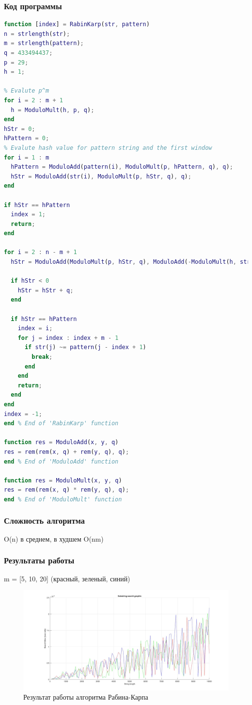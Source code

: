 \documentclass[12pt]{article}
\begin{document}
\subsubsection{Код программы}
\begin{lstlisting}[language={Matlab}, caption={Алгоритм Рабина-Карпа}, label={Script}]
function [index] = RabinKarp(str, pattern)
n = strlength(str);
m = strlength(pattern);
q = 433494437;
p = 29;
h = 1;

% Evalute p^m
for i = 2 : m + 1
  h = ModuloMult(h, p, q);
end
hStr = 0;
hPattern = 0;
% Evalute hash value for pattern string and the first window
for i = 1 : m
  hPattern = ModuloAdd(pattern(i), ModuloMult(p, hPattern, q), q);
  hStr = ModuloAdd(str(i), ModuloMult(p, hStr, q), q);
end

if hStr == hPattern
  index = 1;
  return;
end

for i = 2 : n - m + 1   
  hStr = ModuloAdd(ModuloMult(p, hStr, q), ModuloAdd(-ModuloMult(h, str(i - 1), q), str(i + m - 1), q), q);

  if hStr < 0
    hStr = hStr + q;
  end

  if hStr == hPattern
    index = i;
    for j = index : index + m - 1
      if str(j) ~= pattern(j - index + 1)
        break;
      end
    end
    return;
  end
end
index = -1;
end % End of 'RabinKarp' function

function res = ModuloAdd(x, y, q)
res = rem(rem(x, q) + rem(y, q), q);
end % End of 'ModuloAdd' function

function res = ModuloMult(x, y, q)
res = rem(rem(x, q) * rem(y, q), q);
end % End of 'ModuloMult' function
\end{lstlisting}
\subsubsection{Сложность алгоритма}
O(n) в среднем, в худшем O(nm)
\subsubsection{Результаты работы}
m = [5, 10, 20] (красный, зеленый, синий)
\begin{figure}[h]
	\centering
	\includegraphics[width=0.8\linewidth]{RK.jpg}
	\caption{Результат работы алгоритма Рабина-Карпа}
\end{figure}
\vfill
\end{document}
